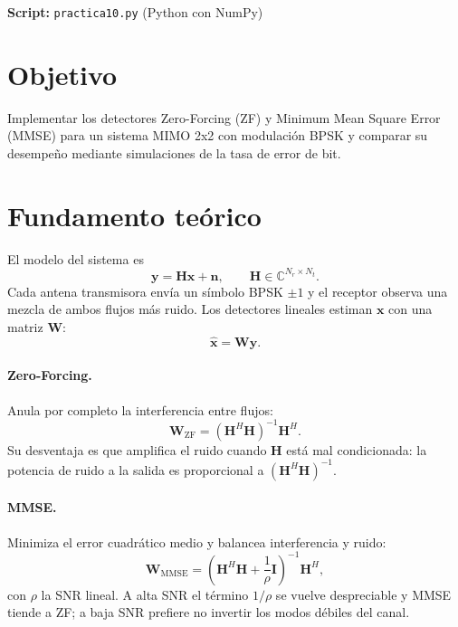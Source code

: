 \documentclass[11pt,a4paper]{article}
\begin{document}

\textbf{Script:} \texttt{practica10.py} (Python con NumPy)

\section{Objetivo}

Implementar los detectores Zero-Forcing (ZF) y Minimum Mean Square Error (MMSE) para un
sistema MIMO 2x2 con modulación BPSK y comparar su desempeño mediante simulaciones de la
tasa de error de bit.

\section{Fundamento teórico}

El modelo del sistema es
\begin{equation}
  \mathbf{y} = \mathbf{H}\mathbf{x} + \mathbf{n},
  \qquad
  \mathbf{H}\in\mathbb{C}^{N_r\times N_t}.
\end{equation}
Cada antena transmisora envía un símbolo BPSK $\pm1$ y el receptor observa una mezcla de
ambos flujos más ruido. Los detectores lineales estiman $\mathbf{x}$ con una matriz
$\mathbf{W}$:
\begin{equation}
  \hat{\mathbf{x}} = \mathbf{W}\mathbf{y}.
\end{equation}

\paragraph{Zero-Forcing.} Anula por completo la interferencia entre flujos:
\begin{equation}
  \mathbf{W}_{\mathrm{ZF}} = \left(\mathbf{H}^{H}\mathbf{H}\right)^{-1}\mathbf{H}^{H}.
\end{equation}
Su desventaja es que amplifica el ruido cuando $\mathbf{H}$ está mal condicionada: la
potencia de ruido a la salida es proporcional a
$\left(\mathbf{H}^{H}\mathbf{H}\right)^{-1}$.

\paragraph{MMSE.} Minimiza el error cuadrático medio y balancea interferencia y ruido:
\begin{equation}
  \mathbf{W}_{\mathrm{MMSE}} = \left(\mathbf{H}^{H}\mathbf{H}
      + \frac{1}{\rho}\mathbf{I}\right)^{-1}\mathbf{H}^{H},
\end{equation}
con $\rho$ la SNR lineal. A alta SNR el término $1/\rho$ se vuelve despreciable y MMSE
tiende a ZF; a baja SNR prefiere no invertir los modos débiles del canal.
\end{document}
